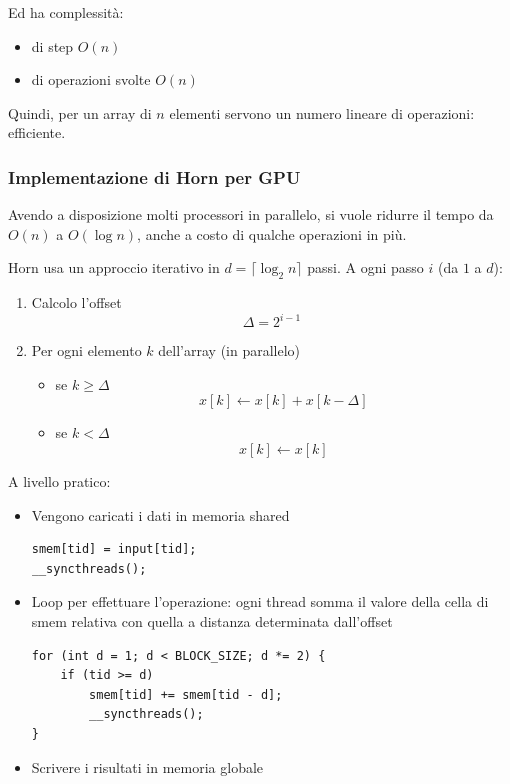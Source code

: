 Ed ha complessità:
\begin{itemize}
    \item di step $O(n)$
    \item di operazioni svolte $O(n)$
\end{itemize}

Quindi, per un array di $n$ elementi servono un numero lineare di operazioni: efficiente.

\subsubsection{Implementazione di Horn per GPU}

Avendo a disposizione molti processori in parallelo, si vuole ridurre il tempo da $O(n)$ a $O(\log n)$, anche a costo di qualche operazioni in più. 

Horn usa un approccio iterativo in $d = \lceil \log_2 n \rceil$ passi. A ogni passo $i$ (da $1$ a $d$):
\begin{enumerate}
    \item Calcolo l'offset 
    $$ \Delta = 2^{i-1} $$
    \item Per ogni elemento $k$ dell'array (in parallelo)
    \begin{itemize}
        \item se $k \geq \Delta$ 
        $$ x[k] \leftarrow x[k] + x[k - \Delta] $$
        \item se $k < \Delta$
        $$ x[k] \leftarrow x[k] $$
    \end{itemize}
\end{enumerate}

A livello pratico:
\begin{itemize}
    \item Vengono caricati i dati in memoria shared
    \begin{lstlisting}[caption={Caricamento dati in shared memory}]
smem[tid] = input[tid];
__syncthreads();
    \end{lstlisting}
    
    \item Loop per effettuare l'operazione: ogni thread somma il valore della cella di smem relativa con quella a distanza determinata dall'offset
    \begin{lstlisting}[caption={Operazione di scan in shared memory}]
for (int d = 1; d < BLOCK_SIZE; d *= 2) {
    if (tid >= d)
        smem[tid] += smem[tid - d];
        __syncthreads();
}
    \end{lstlisting}
    
    \item Scrivere i risultati in memoria globale
\end{itemize}

